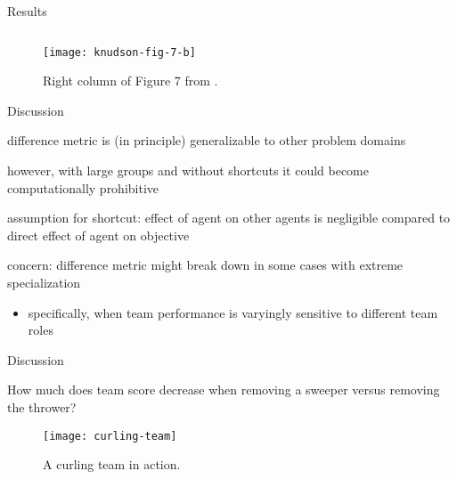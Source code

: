\begin{frame}{Results}

\begin{figure}

\begin{columns}
\begin{column}{0.7\textwidth}
\texttt{[image: knudson-fig-7-b]}
\end{column}
\begin{column}{0.3\textwidth}
\caption{
Right column of Figure 7 from \cite{knudson2010coevolution}.
}
\end{column}
\end{columns}

\end{figure}

\end{frame}

\begin{frame}{Discussion}

difference metric is (in principle) generalizable to other problem domains

however, with large groups and without shortcuts it could become computationally prohibitive

assumption for shortcut:
effect of agent on other agents is negligible compared to direct effect of agent on objective

concern:
difference metric might break down in some cases with extreme specialization
\begin{itemize}
\item specifically, when team performance is varyingly sensitive to different team roles 
\end{itemize}


\end{frame}

\begin{frame}{Discussion}

How much does team score decrease when removing a sweeper versus removing the thrower?

\begin{figure}
\texttt{[image: curling-team]}
\caption{A curling team in action.}
\label{fig:curling-team}
\end{figure}

\end{frame}
